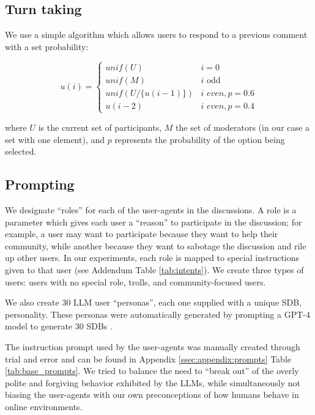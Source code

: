 \subsection{Turn taking}
\label{ssec:experimental:turn}

We use a simple algorithm which allows users to respond to a previous comment with a set probability:

\small
\begin{equation}
\label{eq:turn_taking}
    u(i) = \left\{
\begin{array}{ll}
\textit{unif}(U) & i=0\\
    \textit{unif}(M) & i \text{ odd}\\
    \textit{unif}(U/\{u(i-1)\}) & i \textit{ even}, p=0.6 \\
    u(i-2) & i \textit{ even}, p=0.4 
\end{array} 
\right.
\end{equation}
\normalsize

\noindent where $U$ is the current set of participants, $M$ the set of moderators (in our case a set with one element), and $p$ represents the probability of the option being selected.


\subsection{Prompting}
\label{ssec:experimental:prompts}

We designate “roles” for each of the user-agents in the discussions. A role is a parameter which gives each user a “reason” to participate in the discussion; for example, a user may want to participate because they want to help their community, while another because they want to sabotage the discussion and rile up other users. In our experiments, each role is mapped to special instructions given to that user (see Addendum Table \ref{tab:intents}). We create three types of users: users with no special role, trolls, and community-focused users.

We also create 30 \ac{LLM} user “personas”,  each one supplied with a unique \ac{SDB}, personality. These personas were automatically generated by prompting a GPT-4 model to generate $30$ \acp{SDB} \cite{openai2024gpt4technicalreport}.

The instruction prompt used by the user-agents was manually created through trial and error and can be found in Appendix \ref{ssec:appendix:prompts} Table \ref{tab:base_prompts}. We tried to balance the need to “break out” of the overly polite and forgiving behavior exhibited by the \acp{LLM}, while simultaneously not biasing the user-agents with our own preconceptions of how humans behave in online environments.


